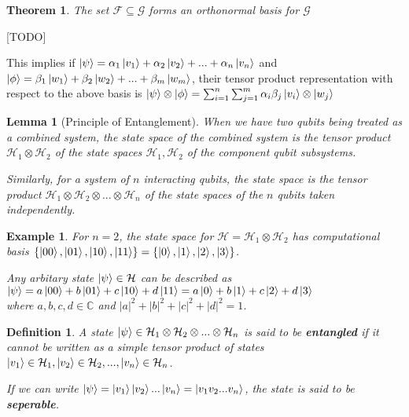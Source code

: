 \documentclass[12pt,twoside,fleqn]{report}
\makeatletter
\theoremstyle{thmstyle}
\renewenvironment{proof}[1][\proofname]{\par
\pushQED{\qed}%
\normalfont \topsep6\p@\@plus6\p@\relax
\trivlist
\item[\hskip\labelsep\itshape#1\@addpunct{.}]\mbox{}\par\nobreak\ignorespaces
}{%
    \popQED\endtrivlist\@endpefalse
    }
\newtheorem{defn}{Definition}[chapter]
\newtheorem{thm}{Theorem}[chapter]
\newtheorem{eg}{Example}[chapter]
\newtheorem{lemma}{Lemma}[chapter]
\makeatother
\begin{document}
\begin{thm}
    The set $\mathcal{F} \subseteq \mathcal{G}$ forms an orthonormal basis for $\mathcal{G}$
\end{thm}
\begin{proof}
    [TODO]
\end{proof}

This implies if $\ket{\psi} = \alpha_1 \ket{v_1} + \alpha_2 \ket{v_2} + ... + \alpha_n \ket{v_n}$ and $\ket{\phi} = \beta_1 \ket{w_1} + \beta_2 \ket{w_2} + ... + \beta_m \ket{w_m}$, their tensor product representation with respect to the above basis is $\ket{\psi} \otimes \ket{\phi} = \sum_{i=1}^n \sum_{j=1}^m \alpha_i \beta_j \ket{v_i} \otimes \ket{w_j}$


\begin{samepage}
    \begin{mdframed}
\begin{lemma}[Principle of Entanglement]
When we have two qubits being treated as a combined system, the state space of the combined system is the tensor product $\mathcal{H}_1 \otimes \mathcal{H}_2$ of the state spaces $\mathcal{H}_1, \mathcal{H}_2$ of the component qubit subsystems. 

    Similarly, for a system of $n$ interacting qubits, the state space is the tensor product $\mathcal{H}_1 \otimes \mathcal{H}_2 \otimes ... \otimes \mathcal{H}_n$ of the state spaces of the $n$ qubits taken independently.
\end{lemma}
    \end{mdframed}
\end{samepage}

\begin{eg}
For $n=2$, the state space for $\mathcal{H} = \mathcal{H}_1 \otimes \mathcal{H}_2$ has computational basis $\{ \ket{00}, \ket{01}, \ket{10}, \ket{11} \} = \{ \ket{0}, \ket{1}, \ket{2}, \ket{3} \}$.

    Any arbitary state $\ket{\psi} \in \mathcal{H}$ can be described as $\ket{\psi} = a \ket{00} + b \ket{01} + c \ket{10} + d \ket{11} = a \ket{0} + b \ket{1} + c \ket{2} + d \ket{3}$ \\ where $a, b, c, d \in \mathbb{C}$ and $|a|^2 + |b|^2 + |c|^2 + |d|^2 = 1$.
\end{eg}


\begin{defn}
    A state $\ket{\psi} \in \mathcal{H}_1 \otimes \mathcal{H}_2 \otimes ... \otimes \mathcal{H}_n$ is said to be \textbf{entangled} if it cannot be written as a simple tensor product of states $\ket{v_1} \in \mathcal{H}_1, \ket{v_2} \in \mathcal{H}_2, ..., \ket{v_n} \in \mathcal{H}_n$. 

    If we can write $\ket{\psi} = \ket{v_1}\ket{v_2}...\ket{v_n} = \ket{v_1 v_2...v_n}$, the state is said to be \textbf{seperable}.
\end{defn}
\end{document}
